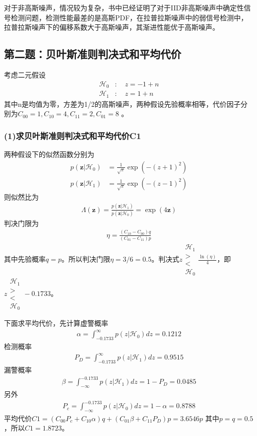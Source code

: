 \documentclass[fontset=windows]{article}
\numberwithin{figure}{section}
\begin{document}
对于非高斯噪声，情况较为复杂，书中已经证明了对于IID非高斯噪声中确定性信号检测问题，检测性能最差的是高斯PDF，在拉普拉斯噪声中的弱信号检测中，拉普拉斯噪声下的偏移系数大于高斯噪声，其渐进性能优于高斯噪声。

\subsection{第二题：贝叶斯准则判决式和平均代价}
考虑二元假设
\begin{align*}
	\mathcal{H}_0 & :\quad z=-1+n \\
	\mathcal{H}_1 & :\quad z=1+n
\end{align*}
其中n是均值为零，方差为1/2的高斯噪声，两种假设先验概率相等，代价因子分别为\(C_{00}=1,C_{10}=4,C_{11}=2,C_{01}=8\)
。

\subsubsection*{(1)求贝叶斯准则判决式和平均代价C1}
两种假设下的似然函数分别为
\begin{align}
	p(\mathbf{z}|\mathcal{H}_0) & =\frac{1}{\sqrt{\pi}}\exp(-(z+1)^2) \\
	p(\mathbf{z}|\mathcal{H}_1) & =\frac{1}{\sqrt{\pi}}\exp(-(z-1)^2)
\end{align}
则似然比为
\begin{align*}
	\Lambda(\mathbf{z})=\frac{p(\mathbf{z}|\mathcal{H}_1)}{p(\mathbf{z}|\mathcal{H}_0)}=\exp(4\mathbf{z})
\end{align*}
判决门限为
\begin{align*}
	\eta=\frac{(C_{10}-C_{00})q}{(C_{01}-C_{11})p}
\end{align*}
其中先验概率\(q=p\)。所以判决门限\(\eta=3/6=0.5\)。判决式\(z\begin{matrix}\mathcal{H}_1\\>\\<\\\mathcal{H_0}\end{matrix}\frac{\ln (\eta)}{4}\)，即\(z\begin{matrix}\mathcal{H}_1\\>\\<\\\mathcal{H_0}\end{matrix}-0.1733\)。

下面求平均代价，先计算虚警概率
\begin{align*}
	\alpha=\int_{-0.1733}^{\infty}p(z|\mathcal{H}_0)dz=0.1212
\end{align*}
检测概率
\begin{align*}
	P_D=\int_{-0.1733}^{\infty}p(z|\mathcal{H}_1)dz=0.9515
\end{align*}
漏警概率
\begin{align*}
	\beta=\int_{-\infty}^{-0.1733}p(z|\mathcal{H}_1)dz=1-P_D=0.0485
\end{align*}
另外\begin{align*}
	P_c=\int_{-\infty}^{-0.1733}p(z|\mathcal{H}_0)dz=1-\alpha=0.8788
\end{align*}
平均代价\(C1=(C_{00}P_c+C_{10}\alpha)q+(C_{01}\beta+C_{11}P_D)p=3.6546p\)
其中\(p=q=0.5\)，所以\(C1=1.8723\)。
\end{document}
